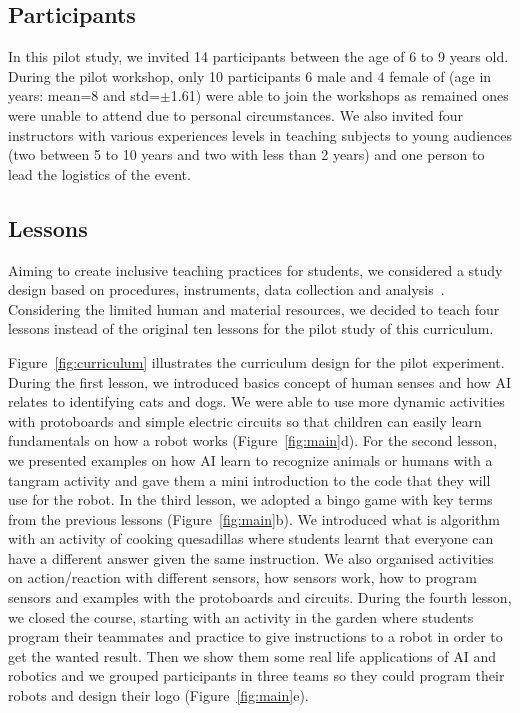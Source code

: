 \documentclass[sigconf]{acmart}
\begin{document}
\subsection{Participants}
In this pilot study, we invited 14 participants between the age of 6 to 9 years old. 
During the pilot workshop, only 10 participants 6 male and 4 female of (age in years: mean=8 and std=$\pm$1.61) were able to join the workshops as remained ones were unable to attend due to personal circumstances. 
We also invited four instructors with various experiences levels in teaching subjects to young audiences (two between 5 to 10 years and two with less than 2 years) and one person to lead the logistics of the event.

\subsection{Lessons}
Aiming to create inclusive teaching practices for students, we considered a study design based on procedures, instruments,  data collection and analysis~\cite{du2022}.
Considering the limited human and material resources, we decided to teach four lessons instead of the original ten lessons for the pilot study of this curriculum.

Figure~\ref{fig:curriculum} illustrates the curriculum design for the pilot experiment. 
During the first lesson, we introduced basics concept of human senses and how AI relates to identifying cats and dogs. We were able to use more dynamic activities with protoboards and simple electric circuits so that children can easily learn fundamentals on how a robot works (Figure~\ref{fig:main}d). 
For the second lesson, we presented examples on how AI learn to recognize animals or humans with a tangram activity and gave them a mini introduction to the code that they will use for the robot.
In the third lesson, we adopted a bingo game with key terms from the previous lessons (Figure~\ref{fig:main}b). We 
introduced what is algorithm with an activity of cooking quesadillas where students learnt that everyone can have a different answer given the same instruction.
We also organised activities on action/reaction with different sensors, how sensors work, how to program sensors and examples with the protoboards and circuits.
During the fourth lesson, we closed the course, starting with an activity in the garden where students program their teammates and practice to give instructions to a robot in order to get the wanted result. Then we show them some real life applications of AI and robotics and we grouped participants in three teams so they could program their robots and design their logo (Figure~\ref{fig:main}e). 
\end{document}

